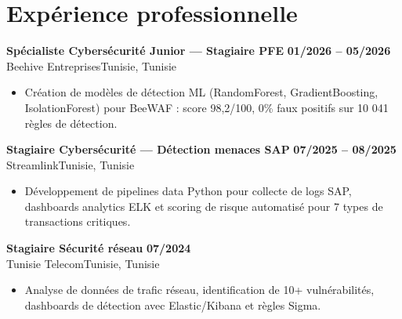 \documentclass[a4paper,9pt]{article}
\newcommand{\cventry}[4]{\textbf{#1} \hfill \textbf{#4}\\[1pt]#2{\ifx\relax#3\relax\else, #3\fi}\par\vspace{1pt}}
\begin{document}
\section{Expérience professionnelle}
\cventry{Spécialiste Cybersécurité Junior --- Stagiaire PFE}{Beehive Entreprises}{Tunisie}{01/2026 -- 05/2026}
\begin{itemize}
  \item Création de modèles de détection ML (RandomForest, GradientBoosting, IsolationForest) pour BeeWAF : score 98,2/100, 0\% faux positifs sur 10 041 règles de détection.
\end{itemize}
\cventry{Stagiaire Cybersécurité --- Détection menaces SAP}{Streamlink}{Tunisie}{07/2025 -- 08/2025}
\begin{itemize}
  \item Développement de pipelines data Python pour collecte de logs SAP, dashboards analytics ELK et scoring de risque automatisé pour 7 types de transactions critiques.
\end{itemize}
\cventry{Stagiaire Sécurité réseau}{Tunisie Telecom}{Tunisie}{07/2024}
\begin{itemize}
  \item Analyse de données de trafic réseau, identification de 10+ vulnérabilités, dashboards de détection avec Elastic/Kibana et règles Sigma.
\end{itemize}
\end{document}

